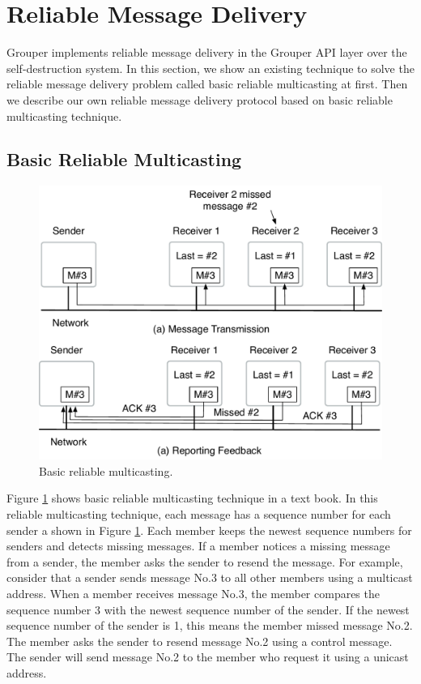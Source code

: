 \documentclass[a4paper,11pt]{report}
\begin{document}
\section{Reliable Message Delivery}  \label{section:reliable_message_delivery}

Grouper implements reliable message delivery in the Grouper API layer over the self-destruction system.
In this section, we show an existing technique to solve the reliable message delivery problem called basic reliable multicasting at first.
Then we describe our own reliable message delivery protocol based on basic reliable multicasting technique.

\subsection{Basic Reliable Multicasting}

\begin{figure}[t]
	\centering
	\includegraphics[scale=0.6]{reliable_multicasting}
	\caption{Basic reliable multicasting.}
	\label{fig:reliable_multicasting}
\end{figure}

Figure \ref{fig:reliable_multicasting} shows basic reliable multicasting technique in a text book\cite{tanenbaum2007distributed}.
In this reliable multicasting technique, each message has a sequence number for each sender a shown in Figure \ref{fig:reliable_multicasting}.
Each member keeps the newest sequence numbers for senders and detects missing messages.
If a member notices a missing message from a sender, the member asks the sender to resend the message.
For example, consider that a sender sends message No.3 to all other members using a multicast address.
When a member receives message No.3, the member compares the sequence number 3 with the newest sequence number of the sender.
If the newest sequence number of the sender is 1, this means the member missed message No.2.
The member asks the sender to resend message No.2 using a control message.
The sender will send message No.2 to the member who request it using a unicast address.
\end{document}

